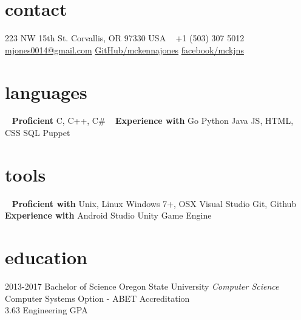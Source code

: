 \documentclass[1]{friggeri-cv} %
\begin{document}


\begin{aside} %
\section{contact}
223 NW 15th St.
Corvallis, OR 97330
USA
~
+1 (503) 307 5012
~
\href{mailto:mjones0014@gmail.com}{mjones0014@gmail.com}
\href{https://github.com/mckennajones}{GitHub/mckennajones}
\href{http://facebook.com/mckjns}{facebook/mckjns}
\section{languages}
~
\textbf{Proficient}
C, C++, C\#
~
\textbf{Experience with}
Go
Python
Java
JS, HTML, CSS
SQL
Puppet
\section{tools}
~
\textbf{Proficient with}
Unix, Linux
Windows 7+, OSX
Visual Studio
Git, Github
~
\textbf{Experience with}
Android Studio
Unity Game Engine
\end{aside}


\section{education}

\begin{entrylist}


\entry
{2013-2017}
{Bachelor {\normalfont of Science}}
{Oregon State University}
{\emph{Computer Science} \\ Computer Systems Option - ABET Accreditation \\ 3.63 Engineering GPA}
\end{entrylist}

\end{document}
